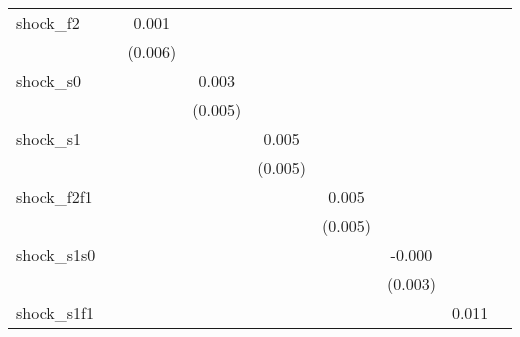 {\begin{tabular}{l*{8}{c}}
\addlinespace
shock\_f2    &                     &       0.001         &                     &                     &                     &                     &                     &                     \\
            &                     &     (0.006)         &                     &                     &                     &                     &                     &                     \\
\addlinespace
shock\_s0    &                     &                     &       0.003         &                     &                     &                     &                     &                     \\
            &                     &                     &     (0.005)         &                     &                     &                     &                     &                     \\
\addlinespace
shock\_s1    &                     &                     &                     &       0.005         &                     &                     &                     &                     \\
            &                     &                     &                     &     (0.005)         &                     &                     &                     &                     \\
\addlinespace
shock\_f2f1  &                     &                     &                     &                     &       0.005         &                     &                     &                     \\
            &                     &                     &                     &                     &     (0.005)         &                     &                     &                     \\
\addlinespace
shock\_s1s0  &                     &                     &                     &                     &                     &      -0.000         &                     &                     \\
            &                     &                     &                     &                     &                     &     (0.003)         &                     &                     \\
\addlinespace
shock\_s1f1  &                     &                     &                     &                     &                     &                     &       0.011         &                     \\

\end{tabular}}
